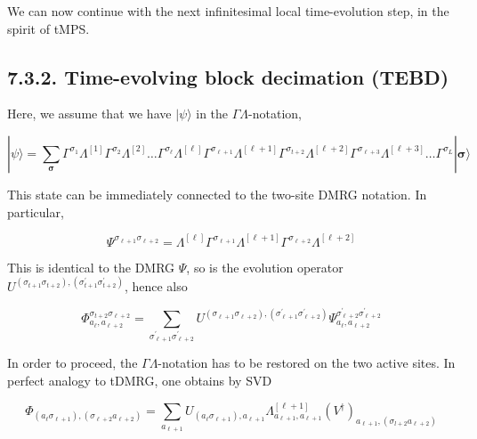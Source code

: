 \documentclass[12pt]{article}
\begin{document}
We can now continue with the next infinitesimal local time-evolution step, in the spirit of tMPS.

\subsection*{7.3.2. Time-evolving block decimation (TEBD)}
Here, we assume that we have $|\psi\rangle$ in the $\Gamma \Lambda$-notation,


\begin{equation*}
|\psi\rangle=\sum_{\boldsymbol{\sigma}} \Gamma^{\sigma_{1}} \Lambda^{[1]} \Gamma^{\sigma_{2}} \Lambda^{[2]} \ldots \Gamma^{\sigma_{\ell}} \Lambda^{[\ell]} \Gamma^{\sigma_{\ell+1}} \Lambda^{[\ell+1]} \Gamma^{\sigma_{t+2}} \Lambda^{[\ell+2]} \Gamma^{\sigma_{\ell+3}} \Lambda^{[\ell+3]} \ldots \Gamma^{\sigma_{L}}|\boldsymbol{\sigma}\rangle \tag{262}
\end{equation*}


This state can be immediately connected to the two-site DMRG notation. In particular,


\begin{equation*}
\Psi^{\sigma_{\ell+1} \sigma_{\ell+2}}=\Lambda^{[\ell]} \Gamma^{\sigma_{\ell+1}} \Lambda^{[\ell+1]} \Gamma^{\sigma_{\ell+2}} \Lambda^{[\ell+2]} \tag{263}
\end{equation*}


This is identical to the DMRG $\Psi$, so is the evolution operator $U^{\left(\sigma_{t+1} \sigma_{t+2}\right),\left(\sigma_{t+1}^{\prime} \sigma_{t+2}^{\prime}\right)}$, hence also


\begin{equation*}
\Phi_{a_{\ell}, a_{\ell+2}}^{\sigma_{t+2} \sigma_{\ell+2}}=\sum_{\sigma_{\ell+1}^{\prime} \sigma_{\ell+2}^{\prime}} U^{\left(\sigma_{\ell+1} \sigma_{\ell+2}\right),\left(\sigma_{\ell+1}^{\prime} \sigma_{\ell+2}^{\prime}\right)} \Psi_{a_{\ell}, a_{\ell+2}}^{\sigma_{\ell+2}^{\prime} \sigma_{\ell+2}^{\prime}} \tag{264}
\end{equation*}


In order to proceed, the $\Gamma \Lambda$-notation has to be restored on the two active sites. In perfect analogy to tDMRG, one obtains by SVD


\begin{equation*}
\Phi_{\left(a_{\ell} \sigma_{\ell+1}\right),\left(\sigma_{\ell+2} a_{\ell+2}\right)}=\sum_{a_{\ell+1}} U_{\left(a_{\ell} \sigma_{\ell+1}\right), a_{\ell+1}} \Lambda_{a_{\ell+1}, a_{\ell+1}}^{[\ell+1]}\left(V^{\dagger}\right)_{a_{\ell+1},\left(\sigma_{l+2} a_{\ell+2}\right)} \tag{265}
\end{equation*}
\end{document}
